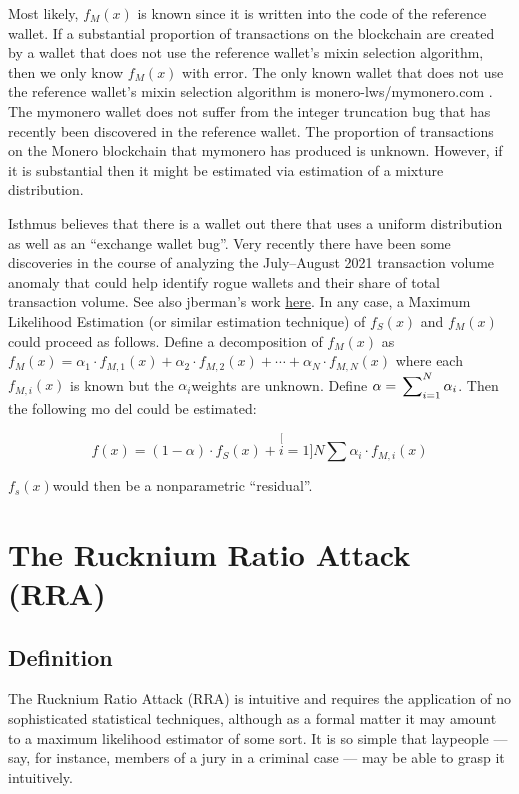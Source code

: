 \documentclass[english]{paper}
\begin{document}
Most likely, $f_{M}(x)$ is known since it is written into the code
of the reference wallet. If a substantial proportion of transactions
on the blockchain are created by a wallet that does not use the reference
wallet's mixin selection algorithm, then we only know $f_{M}(x)$
\textquotedbl with error\textquotedbl . The only known wallet that
does not use the reference wallet's mixin selection algorithm is monero-lws/mymonero.com
. The mymonero wallet does not suffer from the integer truncation
bug that has recently been discovered in the reference wallet. The
proportion of transactions on the Monero blockchain that mymonero
has produced is unknown. However, if it is substantial then it might
be estimated via estimation of a mixture distribution.

Isthmus believes that there is a wallet out there that uses a uniform
distribution as well as an ``exchange wallet bug''. Very recently
there have been some discoveries in the course of analyzing the July--August
2021 transaction volume anomaly that could help identify rogue wallets
and their share of total transaction volume. See also jberman's work
\href{https://github.com/monero-project/research-lab/issues/86\#issuecomment-915806414}{here}.
In any case, a Maximum Likelihood Estimation (or similar estimation
technique) of $f_{S}(x)$ and $f_{M}(x)$ could proceed as follows.
Define a decomposition of $f_{M}(x)$ as $f_{M}(x)=\alpha_{1}\cdot f_{M,1}(x)+\alpha_{2}\cdot f_{M,2}(x)+\cdots+\alpha_{N}\cdot f_{M,N}(x)$
where each $f_{M,i}(x)$ is known but the $\alpha_{i}$weights are
unknown. Define $\alpha=\sideset{}{_{i=1}^{N}}\sum\alpha_{i}$. Then
the following mo del could be estimated:

\[
f(x)=(1-\alpha)\cdot f_{S}(x)+\stackrel[i=1]{N}{\sum}\alpha_{i}\cdot f_{M,i}(x)
\]

$f_{s}(x)$would then be a nonparametric ``residual''.

\section{The Rucknium Ratio Attack (RRA)}

\subsection{Definition}

The Rucknium Ratio Attack (RRA) is intuitive and requires the application
of no sophisticated statistical techniques, although as a formal matter
it may amount to a maximum likelihood estimator of some sort. It is
so simple that laypeople --- say, for instance, members of a jury
in a criminal case --- may be able to grasp it intuitively.
\end{document}
